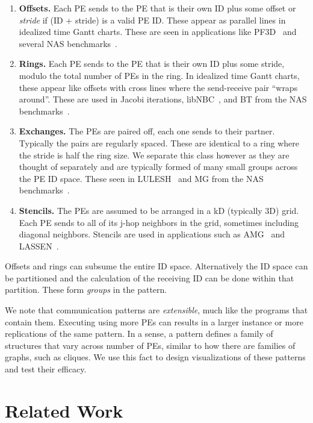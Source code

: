 \begin{enumerate}
    \itemsep0em
    \item \textbf{Offsets.} Each PE sends to the PE that is their own ID plus some offset or {\em stride} if (ID + stride) is a valid PE ID. These appear as parallel lines in idealized time Gantt charts. These are seen in applications like PF3D~\cite{pf3d} and several NAS benchmarks~\cite{nas}.
    
    \item \textbf{Rings.} Each PE sends to the PE that is their own ID plus some stride, modulo the total number of PEs in the ring. In idealized time Gantt charts, these appear like offsets with cross lines where the send-receive pair ``wraps around''. These are used in Jacobi iterations, libNBC~\cite{libnbc}, and BT from the NAS benchmarks~\cite{nas}.
    
    \item \textbf{Exchanges.} The PEs are paired off, each one sends to their partner. Typically the pairs are regularly spaced. These are identical to a ring where the stride is half the ring size. We separate this class however as they are thought of separately and are typically formed of many small groups across the PE ID space. These seen in LULESH~\cite{LULESH} and MG from the NAS benchmarks~\cite{nas}.
    
    \item \textbf{Stencils.} The PEs are assumed to be arranged in a kD (typically 3D) grid. Each PE sends to all of its j-hop neighbors in the grid, sometimes including diagonal neighbors. Stencils are used in applications such as AMG~\cite{amg} and LASSEN~\cite{lassen}.
    
\end{enumerate}

Offsets and rings can subsume the entire ID space. Alternatively the ID space can be partitioned and the calculation of the receiving ID can be done within that partition. These form {\em groups} in the pattern.


We note that communication patterns are {\em extensible}, much like the programs that contain them. Executing using more PEs can results in a larger instance or more replications of the same pattern. In a sense, a pattern defines a family of structures that vary across number of PEs, similar to how there are families of graphs, such as cliques. We use this fact to design visualizations of these patterns and test their efficacy.


\section{Related Work}
\label{sec:related}

